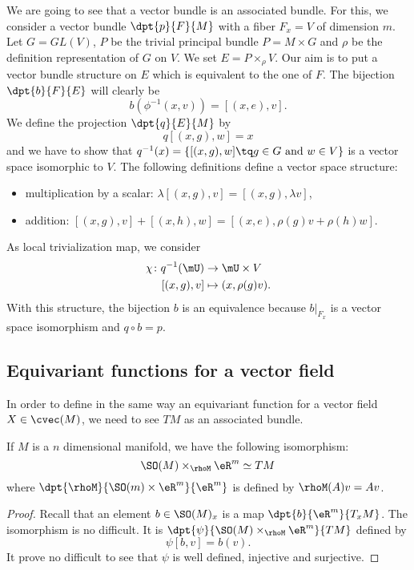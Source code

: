 We are going to see that a vector bundle is an associated bundle. For this, we consider a vector bundle $\dpt{p}{F}{M}$ with a fiber $F_x=V$ of dimension $m$. Let $G=GL(V)$, $P$ be the trivial principal bundle $P=M\times G$ and $\rho$ be the definition representation of $G$ on $V$. We set $E=P\times_{\rho} V$. Our aim is to put a vector bundle structure on $E$ which is equivalent to the one of $F$. The bijection $\dpt{b}{F}{E}$ will clearly be 
\begin{equation}
   b(\phi^{-1}(x,v))=[(x,e),v].
\end{equation}
We define the projection $\dpt{q}{E}{M}$ by
\[
   q[(x,g),w]=x
\]
and we have to show that  $q^{-1}(x)=\{  [(x,g),w]\tq g\in G \textrm{ and } w\in V  \}$ is a vector space isomorphic to $V$. The following definitions define a vector space structure:
\begin{itemize}
\item multiplication by a scalar: $\lambda[(x,g),v]=[(x,g),\lambda v]$,
\item addition: $[(x,g),v]+[(x,h),w]=[(x,e),\rho(g)v+\rho(h)w]$.
\end{itemize}
As local trivialization map, we consider 
\begin{equation}
\begin{aligned}
 \chi\colon q^{-1}(\mU)&\to \mU\times V \\ 
    [(x,g),v]  &\mapsto(x,\rho(g)v).
\end{aligned}
\end{equation}
With this structure, the bijection $b$ is an equivalence because $b|_{F_x}$ is a vector space isomorphism and $q\circ b=p$.

\subsection{Equivariant functions for a vector field}	\label{equivvec}

In order to define in the same way an equivariant function for a vector field $X\in\cvec(M)$, we need to see $TM$ as an associated bundle.

\begin{proposition}
If $M$ is a $n$ dimensional manifold, we have the following isomorphism:
\[
     \SO(M)\times_{\rhoM}\eR^m\simeq TM
\]
where $\dpt{\rhoM}{\SO(m)\times\eR^m}{\eR^m}$ is defined by $\rhoM(A)v=Av$.
\end{proposition}
\begin{proof}
Recall that an element $b\in \SO(M)_x$ is a map $\dpt{b}{\eR^m}{T_xM}$. The isomorphism is no difficult. It is $\dpt{\psi}{\SO(M)\times_{\rhoM}\eR^m}{TM}$ defined by
\[\psi[b,v]=b(v).\]
It prove no difficult to see that $\psi$ is well defined, injective and surjective.
\end{proof}


